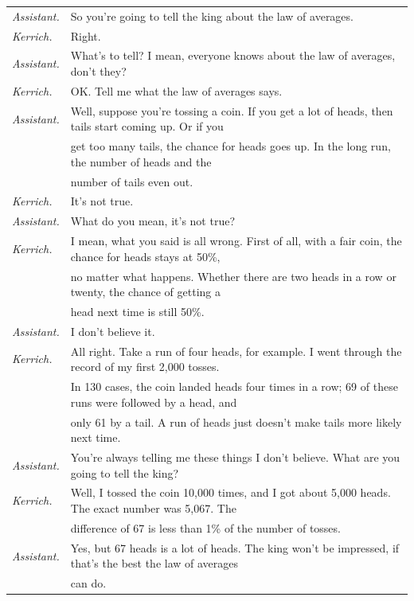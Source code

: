 \documentclass[10pt]{article}
\begin{document}
{\setlength\tabcolsep{3pt}\begin{tabular}{ll}
\textit{Assistant.} & So you're going to tell the king about the law of averages.\\[3pt]
\textit{Kerrich.} & Right.\\[3pt]
\textit{Assistant.} & What's to tell?  I mean, everyone knows about the law of averages,
   don't they?\\[3pt]
\textit{Kerrich.} & OK.  Tell me what the law of averages says.\\[3pt]
\textit{Assistant.} & Well, suppose you're tossing a coin.  If you get a lot of 
    heads, then tails start coming up.  Or if you\\
     &  get too many tails, the chance for heads goes up.  In the long run, the
      number of heads and the \\ & number of tails even out.\\[3pt]
\textit{Kerrich.} & It's not true.\\[3pt]
\textit{Assistant.} & What do you mean, it's not true?\\[3pt]
\textit{Kerrich.} & I mean, what you said is all wrong.  First of all, with a fair coin, the chance for heads stays at 50\%,\\
   & no matter what happens. Whether there are two heads in a row or twenty, the chance of getting a\\
   & head next time is still 50\%.\\[3pt]
\textit{Assistant.} & I don't believe it.\\[3pt]
\textit{Kerrich.} & All right.  Take a run of four heads, for example.  I went through the 
  record of my first 2,000 tosses.\\
   &   In 130 cases, the coin landed heads four times in a row; 69 of these runs were followed by a head,
  and \\
   &  only 61 by a tail. A run of heads just doesn't make tails more likely 
   next time.\\[3pt]
\textit{Assistant.} & You're always telling me these things I don't believe.  What are you 
   going to tell the king?\\[3pt]
\textit{Kerrich.} & Well, I tossed the coin 10,000 times, and I got about 5,000 heads.  
   The exact number was 5,067.  The \\
   & difference of 67 is less than 1\% of the number of tosses. \\[3pt]
\textit{Assistant.} & Yes, but 67 heads is a lot of heads.  The king won't be impressed, if that's the best the law of averages\\ & can do.\\[3pt]

\end{tabular}}
\end{document}
